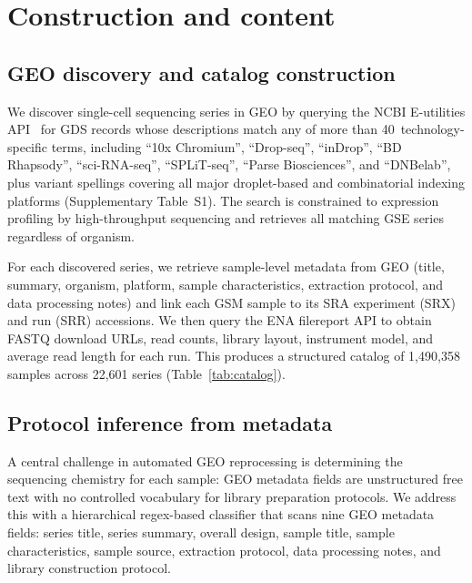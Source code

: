 \documentclass[10pt,twocolumn,letterpaper]{article}
\begin{document}
\section{Construction and content}

\subsection{GEO discovery and catalog construction}

We discover single-cell sequencing series in GEO by querying the NCBI
E-utilities API~\citep{sayers2022} for GDS records whose descriptions
match any of more than 40~technology-specific terms, including ``10x
Chromium'', ``Drop-seq'', ``inDrop'', ``BD Rhapsody'', ``sci-RNA-seq'',
``SPLiT-seq'', ``Parse Biosciences'', and ``DNBelab'', plus variant
spellings covering all major droplet-based and combinatorial indexing
platforms (Supplementary Table~S1). The search is constrained to
expression profiling by high-throughput sequencing and retrieves all
matching GSE series regardless of organism.

For each discovered series, we retrieve sample-level metadata from GEO
(title, summary, organism, platform, sample characteristics, extraction
protocol, and data processing notes) and link each GSM sample to its SRA
experiment (SRX) and run (SRR) accessions. We then query the ENA filereport
API to obtain FASTQ download URLs, read counts, library layout, instrument
model, and average read length for each run. This produces a structured
catalog of 1,490,358 samples across 22,601 series (Table~\ref{tab:catalog}).

\subsection{Protocol inference from metadata}
\label{sec:inference}

A central challenge in automated GEO reprocessing is determining the
sequencing chemistry for each sample: GEO metadata fields are unstructured
free text with no controlled vocabulary for library preparation protocols.
We address this with a hierarchical regex-based classifier that scans nine
GEO metadata fields: series title, series summary, overall design, sample
title, sample characteristics, sample source, extraction protocol, data
processing notes, and library construction protocol.
\end{document}
